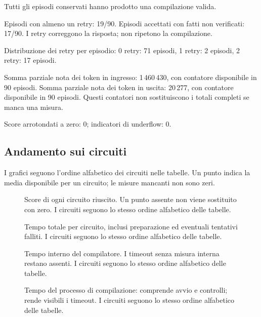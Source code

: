 Tutti gli episodi conservati hanno prodotto una compilazione valida.

Episodi con almeno un retry: 19/90. Episodi accettati con fatti non verificati: 17/90. I retry correggono la risposta; non ripetono la compilazione.

Distribuzione dei retry per episodio: 0 retry: 71 episodi, 1 retry: 2 episodi, 2 retry: 17 episodi.

Somma parziale nota dei token in ingresso: 1\,460\,430, con contatore disponibile in 90 episodi. Somma parziale nota dei token in uscita: 20\,277, con contatore disponibile in 90 episodi. Questi contatori non sostituiscono i totali completi se manca una misura.

Score arrotondati a zero: 0; indicatori di underflow: 0.
\subsection{Andamento sui circuiti}
I grafici seguono l’ordine alfabetico dei circuiti nelle tabelle. Un punto indica la media disponibile per un circuito; le misure mancanti non sono zeri.

\begin{figure}[!htbp]\centering

\caption{Score di ogni circuito riuscito. Un punto assente non viene sostituito con zero. I circuiti seguono lo stesso ordine alfabetico delle tabelle.}
\end{figure}

\begin{figure}[!htbp]\centering

\caption{Tempo totale per circuito, inclusi preparazione ed eventuali tentativi falliti. I circuiti seguono lo stesso ordine alfabetico delle tabelle.}
\end{figure}

\begin{figure}[!htbp]\centering

\caption{Tempo interno del compilatore. I timeout senza misura interna restano assenti. I circuiti seguono lo stesso ordine alfabetico delle tabelle.}
\end{figure}

\begin{figure}[!htbp]\centering

\caption{Tempo del processo di compilazione: comprende avvio e controlli; rende visibili i timeout. I circuiti seguono lo stesso ordine alfabetico delle tabelle.}
\end{figure}

